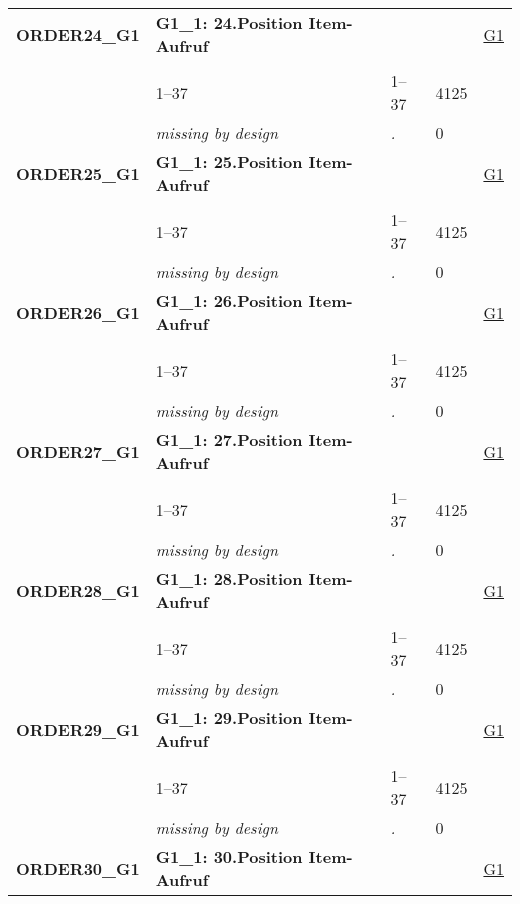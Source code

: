 \begin{longtable}{| L{2.65cm} | L{8cm} | C{1.5cm} | R{1.25cm} | C{2.25cm}  |}
   \midrule
\textbf{ORDER24\_G1}\label{var:ORDER24:G1} & \textbf{G1\_1: 24.Position Item-Aufruf} &  &  & \hyperref[G1]{G1} \\ 
   &  &  &  &  \\ 
   & 1--37 & 1--37 & 4125 &  \\ 
   & \textit{missing by design} & \textit{.} & 0 &  \\ 
   \midrule
\textbf{ORDER25\_G1}\label{var:ORDER25:G1} & \textbf{G1\_1: 25.Position Item-Aufruf} &  &  & \hyperref[G1]{G1} \\ 
   &  &  &  &  \\ 
   & 1--37 & 1--37 & 4125 &  \\ 
   & \textit{missing by design} & \textit{.} & 0 &  \\ 
   \midrule
\textbf{ORDER26\_G1}\label{var:ORDER26:G1} & \textbf{G1\_1: 26.Position Item-Aufruf} &  &  & \hyperref[G1]{G1} \\ 
   &  &  &  &  \\ 
   & 1--37 & 1--37 & 4125 &  \\ 
   & \textit{missing by design} & \textit{.} & 0 &  \\ 
   \midrule
\textbf{ORDER27\_G1}\label{var:ORDER27:G1} & \textbf{G1\_1: 27.Position Item-Aufruf} &  &  & \hyperref[G1]{G1} \\ 
   &  &  &  &  \\ 
   & 1--37 & 1--37 & 4125 &  \\ 
   & \textit{missing by design} & \textit{.} & 0 &  \\ 
   \midrule
\textbf{ORDER28\_G1}\label{var:ORDER28:G1} & \textbf{G1\_1: 28.Position Item-Aufruf} &  &  & \hyperref[G1]{G1} \\ 
   &  &  &  &  \\ 
   & 1--37 & 1--37 & 4125 &  \\ 
   & \textit{missing by design} & \textit{.} & 0 &  \\ 
   \midrule
\textbf{ORDER29\_G1}\label{var:ORDER29:G1} & \textbf{G1\_1: 29.Position Item-Aufruf} &  &  & \hyperref[G1]{G1} \\ 
   &  &  &  &  \\ 
   & 1--37 & 1--37 & 4125 &  \\ 
   & \textit{missing by design} & \textit{.} & 0 &  \\ 
   \midrule
\textbf{ORDER30\_G1}\label{var:ORDER30:G1} & \textbf{G1\_1: 30.Position Item-Aufruf} &  &  & \hyperref[G1]{G1} \\ 

\end{longtable}
